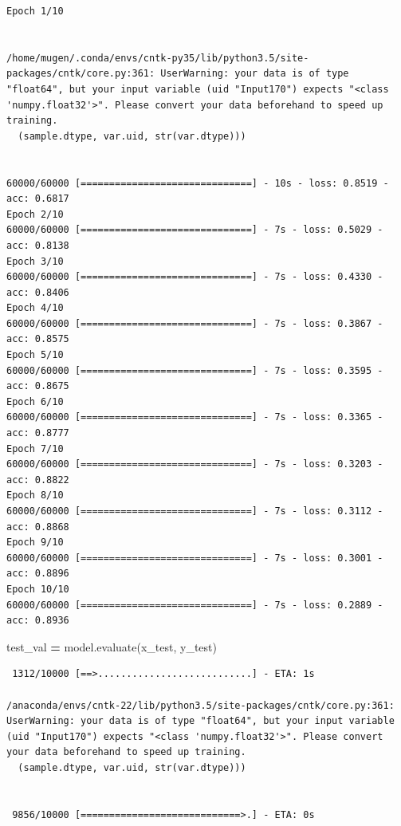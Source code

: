 \documentclass[]{book}
\newenvironment{Shaded}{\begin{snugshade}}{\end{snugshade}}
\newcommand{\DecValTok}[1]{\textcolor[rgb]{0.00,0.00,0.81}{#1}}
\newcommand{\SpecialCharTok}[1]{\textcolor[rgb]{0.00,0.00,0.00}{#1}}
\newcommand{\StringTok}[1]{\textcolor[rgb]{0.31,0.60,0.02}{#1}}
\newcommand{\OperatorTok}[1]{\textcolor[rgb]{0.81,0.36,0.00}{\textbf{#1}}}
\newcommand{\BuiltInTok}[1]{#1}
\newcommand{\NormalTok}[1]{#1}
\theoremstyle{definition}
\theoremstyle{definition}
\theoremstyle{definition}
\theoremstyle{remark}
\begin{document}
\begin{verbatim}
Epoch 1/10


/home/mugen/.conda/envs/cntk-py35/lib/python3.5/site-packages/cntk/core.py:361: UserWarning: your data is of type "float64", but your input variable (uid "Input170") expects "<class 'numpy.float32'>". Please convert your data beforehand to speed up training.
  (sample.dtype, var.uid, str(var.dtype)))


60000/60000 [==============================] - 10s - loss: 0.8519 - acc: 0.6817    
Epoch 2/10
60000/60000 [==============================] - 7s - loss: 0.5029 - acc: 0.8138     
Epoch 3/10
60000/60000 [==============================] - 7s - loss: 0.4330 - acc: 0.8406     
Epoch 4/10
60000/60000 [==============================] - 7s - loss: 0.3867 - acc: 0.8575     
Epoch 5/10
60000/60000 [==============================] - 7s - loss: 0.3595 - acc: 0.8675     
Epoch 6/10
60000/60000 [==============================] - 7s - loss: 0.3365 - acc: 0.8777     
Epoch 7/10
60000/60000 [==============================] - 7s - loss: 0.3203 - acc: 0.8822     
Epoch 8/10
60000/60000 [==============================] - 7s - loss: 0.3112 - acc: 0.8868     
Epoch 9/10
60000/60000 [==============================] - 7s - loss: 0.3001 - acc: 0.8896     
Epoch 10/10
60000/60000 [==============================] - 7s - loss: 0.2889 - acc: 0.8936     
\end{verbatim}

\begin{Shaded}
\begin{Highlighting}[]
\NormalTok{test_val }\OperatorTok{=}\NormalTok{ model.evaluate(x_test, y_test)}
\end{Highlighting}
\end{Shaded}

\begin{verbatim}
 1312/10000 [==>...........................] - ETA: 1s

/anaconda/envs/cntk-22/lib/python3.5/site-packages/cntk/core.py:361: UserWarning: your data is of type "float64", but your input variable (uid "Input170") expects "<class 'numpy.float32'>". Please convert your data beforehand to speed up training.
  (sample.dtype, var.uid, str(var.dtype)))


 9856/10000 [============================>.] - ETA: 0s
\end{verbatim}

\begin{Shaded}
\end{Shaded}
\end{document}
